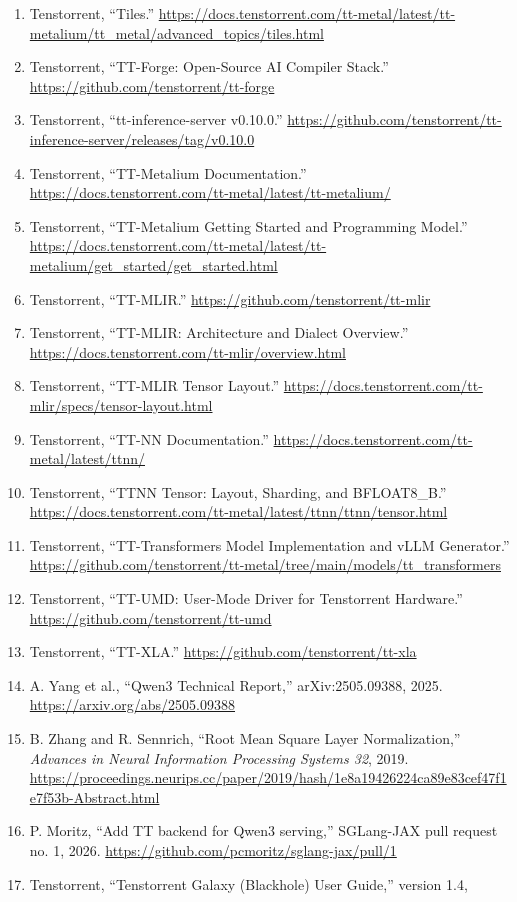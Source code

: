 \documentclass[
  10pt,
  american,
  10pt,
  letterpaper]{article}
\begin{document}
\begin{enumerate}
\item
  Tenstorrent, ``Tiles.''
  \url{https://docs.tenstorrent.com/tt-metal/latest/tt-metalium/tt_metal/advanced_topics/tiles.html}
\item
  Tenstorrent, ``TT-Forge: Open-Source AI Compiler Stack.''
  \url{https://github.com/tenstorrent/tt-forge}
\item
  Tenstorrent, ``tt-inference-server v0.10.0.''
  \url{https://github.com/tenstorrent/tt-inference-server/releases/tag/v0.10.0}
\item
  Tenstorrent, ``TT-Metalium Documentation.''
  \url{https://docs.tenstorrent.com/tt-metal/latest/tt-metalium/}
\item
  Tenstorrent, ``TT-Metalium Getting Started and Programming Model.''
  \url{https://docs.tenstorrent.com/tt-metal/latest/tt-metalium/get_started/get_started.html}
\item
  Tenstorrent, ``TT-MLIR.'' \url{https://github.com/tenstorrent/tt-mlir}
\item
  Tenstorrent, ``TT-MLIR: Architecture and Dialect Overview.''
  \url{https://docs.tenstorrent.com/tt-mlir/overview.html}
\item
  Tenstorrent, ``TT-MLIR Tensor Layout.''
  \url{https://docs.tenstorrent.com/tt-mlir/specs/tensor-layout.html}
\item
  Tenstorrent, ``TT-NN Documentation.''
  \url{https://docs.tenstorrent.com/tt-metal/latest/ttnn/}
\item
  Tenstorrent, ``TTNN Tensor: Layout, Sharding, and BFLOAT8\_B.''
  \url{https://docs.tenstorrent.com/tt-metal/latest/ttnn/ttnn/tensor.html}
\item
  Tenstorrent, ``TT-Transformers Model Implementation and vLLM
  Generator.''
  \url{https://github.com/tenstorrent/tt-metal/tree/main/models/tt_transformers}
\item
  Tenstorrent, ``TT-UMD: User-Mode Driver for Tenstorrent Hardware.''
  \url{https://github.com/tenstorrent/tt-umd}
\item
  Tenstorrent, ``TT-XLA.'' \url{https://github.com/tenstorrent/tt-xla}
\item
  A. Yang et al., ``Qwen3 Technical Report,'' arXiv:2505.09388, 2025.
  \url{https://arxiv.org/abs/2505.09388}
\item
  B. Zhang and R. Sennrich, ``Root Mean Square Layer Normalization,''
  \emph{Advances in Neural Information Processing Systems 32}, 2019.
  \url{https://proceedings.neurips.cc/paper/2019/hash/1e8a19426224ca89e83cef47f1e7f53b-Abstract.html}
\item
  P. Moritz, ``Add TT backend for Qwen3 serving,'' SGLang-JAX pull
  request no. 1, 2026.
  \url{https://github.com/pcmoritz/sglang-jax/pull/1}
\item
  Tenstorrent, ``Tenstorrent Galaxy (Blackhole) User Guide,'' version
  1.4,


\end{enumerate}
\end{document}
